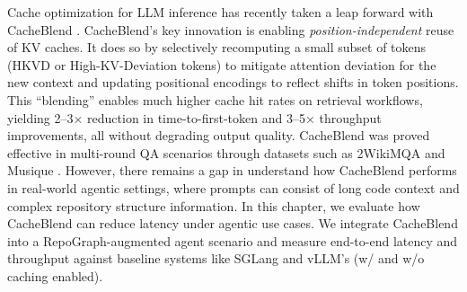 Cache optimization for LLM inference has recently taken a leap forward with CacheBlend \cite{yao2025cacheblendfastlargelanguage}. CacheBlend’s key innovation is enabling \emph{position-independent} reuse of KV caches. It does so by selectively recomputing a small subset of tokens (HKVD or High-KV-Deviation tokens) to mitigate attention deviation for the new context and updating positional encodings to reflect shifts in token positions. This “blending” enables much higher cache hit rates on retrieval workflows, yielding 2–3× reduction in time-to-first-token and 3–5× throughput improvements, all without degrading output quality. CacheBlend was proved effective in multi-round QA scenarios through datasets such as 2WikiMQA and Musique \cite{ho2020constructingmultihopqadataset, trivedi2022musiquemultihopquestionssinglehop} . However, there remains a gap in understand how CacheBlend performs in real-world agentic settings, where prompts can consist of long code context and complex repository structure information. In this chapter, we evaluate  how CacheBlend can reduce latency under agentic use cases. We integrate CacheBlend into a RepoGraph-augmented agent scenario and measure end-to-end latency and throughput against baseline systems like SGLang and vLLM’s (w/ and w/o caching enabled).

